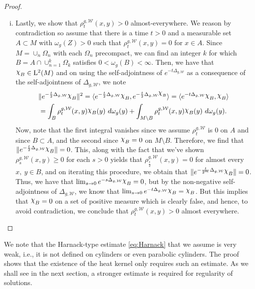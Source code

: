 \documentclass[a4paper, 12pt]{amsart}
\numberwithin{equation}{section}
\renewcommand{\~}{\tilde}
\renewcommand{\-}{\bar}
\newcommand{\8}{\infty}
\newcommand{\cW}{\mathcal{W}}
\newcommand{\union}{\cup}
\newcommand{\intersect}{\cap}
\newcommand{\ind}[1]{\raisebox{\depth}{\(\chi\)}_{#1}}	%
\newcommand{\norm}[1]{\| #1 \|}			%
\newcommand{\inprod}[1]{\langle #1 \rangle}	%
\newcommand{\Lp}[2][{}]{{\rm L}^{#2}_{\rm #1}}		%
\newcommand{\hk}{\rho}
\begin{document}
\begin{proof}
\begin{enumerate}[(i)]
\item Lastly, we show that $\hk^{g,\cW}_t(x,y) > 0$  almost-everywhere.
	We reason by contradiction so assume that there
	is a time $t > 0$ and a measurable set $A \subset M$ with $\omega_g(Z) > 0$
	such that $\hk^{g,\cW}_t(x,y) = 0$ for $x \in A$.
	Since $M = \union_{n} \Omega_n$ with each 
	$\Omega_n$ precompact, we can find an integer
	$k$ for which $B = A \intersect \union_{n=1}^k \Omega_k$ 
	satisfies $0 < \omega_g(B) < \infty$. Then,
	we have that $\ind{B} \in \Lp{2}(M)$ and 
	on using the self-adjointness of $e^{-t\Delta_{g,\cW}}$ as a consequence 
	of the self-adjointness of $\Delta_{g,\cW}$,
	we note
	\begin{multline*}  
	\norm{e^{-\frac{t}{2} \Delta_{g,\cW}}\ind{B}}^2 
		 = \inprod{e^{-\frac{t}{2} \Delta_{g,\cW}} \ind{B}, e^{-{\frac{t}{2}}\Delta_{g,\cW} \ind{B}}}
		 = \inprod{e^{-t \Delta_{g,\cW}} \ind{B},\ind{B}} \\
		= \int_{B} \hk^{g,\cW}_t(x,y)\ind{B}(y)\ d\omega_g(y) + 
			\int_{M \setminus B} \hk^{g,\cW}_t(x,y)\ind{B}(y)\ d\omega_g(y).
	\end{multline*}
	Now, note that the first integral vanishes
	since we assume $\hk^{g,\cW}_t$ is $0$ on $A$ and since $B \subset A$, 
	and the second since $\ind{B} = 0$ on $M \setminus B$.
	Therefore, we find that $\norm{e^{-\frac{t}{2} \Delta_{g,\cW}} \ind{B}} = 0$.
	This, along with the fact that we've shown $\hk^{g,\cW}_s(x,y) \geq 0$ 
	for each $s > 0$ yields that $\hk^{g,\cW}_{\frac{t}{2}}(x,y) = 0$ for 
	almost every $x,\ y \in B$, and on 
	iterating this procedure, we obtain that
	$\norm{e^{-\frac{t}{2^m} \Delta_{g,\cW}} \ind{B}} = 0$.
	Thus, we have that $\lim_{s\to 0} e^{-s \Delta_{g,\cW}} \ind{B} = 0$, 
	but by the non-negative self-adjointness of
	$\Delta_{g,\cW}$, we know that $\lim_{s \to 0} e^{-t \Delta_{g,\cW}} \ind{B} = \ind{B}$.
	But this implies that $\ind{B} = 0$ on a set of positive measure which is clearly false, 
	and hence, to avoid contradiction, we conclude that $\hk^{g,\cW}_t(x,y) > 0$ almost everywhere.
	\qedhere
\end{enumerate} 
\end{proof}

\begin{rem}
We note that the Harnack-type estimate \eqref{eq:Harnack} that we assume is very 
weak, i.e., it is not defined on cylinders or even 
parabolic cylinders. The proof shows that the existence 
of the heat kernel only requires such an estimate. 
As we shall see in the next section, a stronger
estimate is required for regularity of solutions. 
\end{rem}
\end{document}
